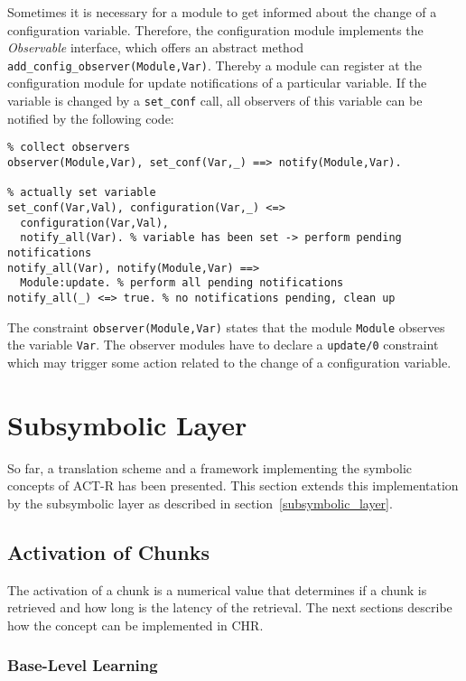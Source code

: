 Sometimes it is necessary for a module to get informed about the change of a configuration variable. Therefore, the configuration module implements the \emph{Observable} interface, which offers an abstract method \lstinline|add_config_observer(Module,Var)|. Thereby a module can register at the configuration module for update notifications of a particular variable. If the variable is changed by a \lstinline|set_conf| call, all observers of this variable can be notified by the following code:

\begin{lstlisting}
% collect observers
observer(Module,Var), set_conf(Var,_) ==> notify(Module,Var).

% actually set variable
set_conf(Var,Val), configuration(Var,_) <=> 
  configuration(Var,Val),
  notify_all(Var). % variable has been set -> perform pending notifications
notify_all(Var), notify(Module,Var) ==> 
  Module:update. % perform all pending notifications
notify_all(_) <=> true. % no notifications pending, clean up
\end{lstlisting}

The constraint \lstinline|observer(Module,Var)| states that the module \lstinline|Module| observes the variable \lstinline|Var|. The observer modules have to declare a \lstinline|update/0| constraint which may trigger some action related to the change of a configuration variable.

\section{Subsymbolic Layer}

So far, a translation scheme and a framework implementing the symbolic concepts of ACT-R has been presented. This section extends this implementation by the subsymbolic layer as described in section~\ref{subsymbolic_layer}.

\subsection{Activation of Chunks}

The activation of a chunk is a numerical value that determines if a chunk is retrieved and how long is the latency of the retrieval. The next sections describe how the concept can be implemented in CHR.

\subsubsection{Base-Level Learning}

